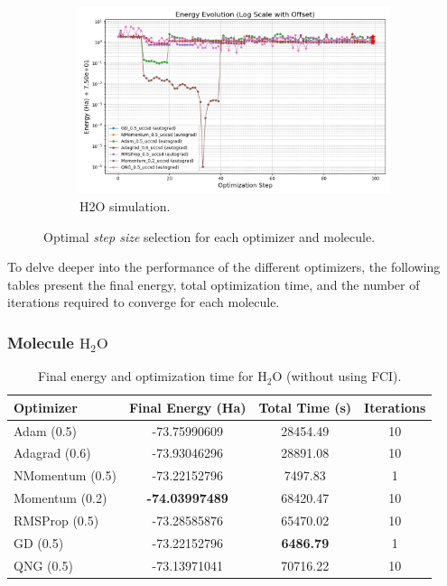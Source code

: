 \begin{figure}[H]
\begin{subfigure}{0.32\textwidth}
    \includegraphics[width=\textwidth]{data/Optimizadores/final_results_H20/energy_evolution_log_offset.png}
    \caption{H2O simulation.}
    \label{fig:subimage3}
  \end{subfigure}
  \caption{Optimal \emph{step size} selection for each optimizer and molecule.}
  \label{fig:three_images}
\end{figure}

To delve deeper into the performance of the different optimizers, the following tables present the final energy, total optimization time, and the number of iterations required to converge for each molecule.

\subsubsection{Molecule \(\mathrm{H_2O}\)}

\begin{table}[H]
\centering
\caption{Final energy and optimization time for \(\mathrm{H_2O}\) (without using FCI).}
\begin{tabular}{lccc}
\toprule
\textbf{Optimizer} & \textbf{Final Energy (Ha)} & \textbf{Total Time (s)} & \textbf{Iterations} \\
\midrule
Adam (0.5)       & -73.75990609 & 28454.49 & 10 \\
Adagrad (0.6)    & -73.93046296 & 28891.08 & 10 \\
NMomentum (0.5)  & -73.22152796 & 7497.83  &  1 \\
Momentum (0.2)   & \textbf{-74.03997489} & 68420.47 & 10 \\
RMSProp (0.5)    & -73.28585876 & 65470.02 & 10 \\
GD (0.5)         & -73.22152796 & \textbf{6486.79}  &  1 \\
QNG (0.5)        & -73.13971041 & 70716.22 & 10 \\
\bottomrule
\end{tabular}
\end{table}

